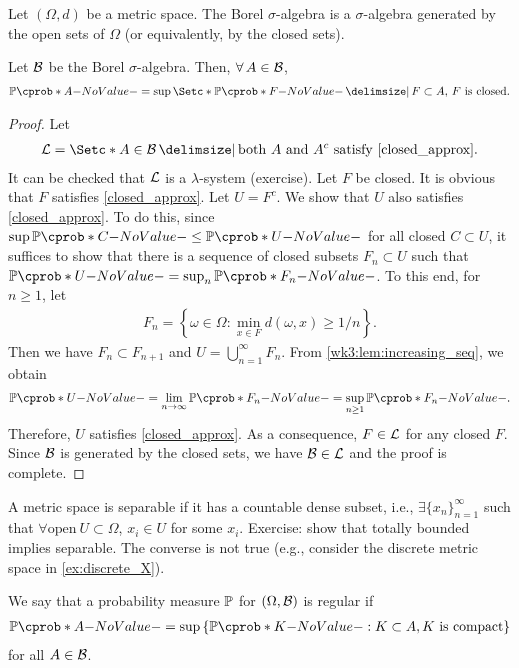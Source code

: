 \documentclass[12pt]{article}
\begin{document}
\begin{Definition} \label{Defns:Borel_sigma_algebra}
Let $(\Omega, d)$ be a metric space. The Borel $\sigma$-algebra is a $\sigma$-algebra generated by the open sets of $\Omega$ (or equivalently, by the closed sets).
\end{Definition}
%
\begin{Lemma}\label{wk3:lem:closed_approx}
Let $\mathcal{B}$ be the Borel $\sigma$-algebra. Then, $\forall A \in \calB$,
\begin{align} \label{closed_approx}
\P(A) = \sup \set*{ \P(F) \given F \subset A,\, F\ \text{is closed}}.
\end{align}
\end{Lemma}
\begin{proof}
Let
\begin{align*}
\calL = \set*{A \in \calB \given \text{both $A$ and $A^c$ satisfy \cref{closed_approx}}}.
\end{align*} 
It can be checked that $\mathcal{L}$ is a $\lambda$-system (exercise). Let $F$ be closed. It is obvious that $F$ satisfies \cref{closed_approx}. Let $U = F^c$. We show that $U$ also satisfies \cref{closed_approx}. To do this, since $\sup \P(C) \leq \P(U)$ for all closed $C\subset U$, it suffices to show that there is a sequence of closed subsets $F_n\subset U$ such that $\P(U)=\sup_n \P(F_n)$. To this end, for $n\geq 1$, let
\begin{align*}
F_n = \left\{\omega \in \Omega: \min\limits_{x \in F}d(\omega, x) \geq 1/n \right\}.
\end{align*}
Then we have $F_n \subset F_{n+1}$ and $U = \bigcup\limits_{n=1}^{\infty} F_n$. From \cref{wk3:lem:increasing_seq}, we obtain
\begin{align*}
\P(U) = \lim_{n \to \infty} \P(F_n) = \sup\limits_{n \geq 1} \P(F_n).
\end{align*}
Therefore, $U$ satisfies \cref{closed_approx}. As a consequence, $F \in \mathcal{L}$ for any closed $F$. Since $\mathcal{B}$ is generated by the closed sets, we have $\mathcal{B} \in \mathcal{L}$ and the proof is complete.
\end{proof}

A metric space is separable if it has a countable dense subset, i.e., $\exists \{x_n\}_{n=1}^{\infty}$ such that $\forall \text{open}\ U \subset \Omega$, $x_i \in U$ for some $x_i$. Exercise: show that totally bounded implies separable. The converse is not true (e.g., consider the discrete metric space in \cref{ex:discrete_X}). 

\begin{Definition}\label{wk3:def:regular}
We say that a probability measure $\P$ for $(\Omega,\mathcal{B})$ is regular if
\begin{align*}
\P(A) = \sup\left\{\P(K): K \subset A, K\ \text{is compact}\right\}
\end{align*}
for all $A\in\mathcal{B}$.
\end{Definition}
\end{document}
